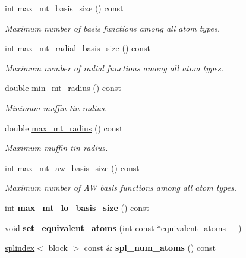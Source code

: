 \begin{DoxyCompactItemize}
int \hyperlink{classsirius_1_1_unit__cell_a22a732322dd61dda3120337e058047e0}{max\+\_\+mt\+\_\+basis\+\_\+size} () const 
\begin{DoxyCompactList}\small\item\em Maximum number of basis functions among all atom types. \end{DoxyCompactList}\item 
int \hyperlink{classsirius_1_1_unit__cell_a8f80f526f0dd59e15daef8439af0b577}{max\+\_\+mt\+\_\+radial\+\_\+basis\+\_\+size} () const 
\begin{DoxyCompactList}\small\item\em Maximum number of radial functions among all atom types. \end{DoxyCompactList}\item 
double \hyperlink{classsirius_1_1_unit__cell_a60ff58a73dd2989afdafc9b37fbd68df}{min\+\_\+mt\+\_\+radius} () const 
\begin{DoxyCompactList}\small\item\em Minimum muffin-\/tin radius. \end{DoxyCompactList}\item 
double \hyperlink{classsirius_1_1_unit__cell_ae4e421483e55a809f781fb9f197078c6}{max\+\_\+mt\+\_\+radius} () const 
\begin{DoxyCompactList}\small\item\em Maximum muffin-\/tin radius. \end{DoxyCompactList}\item 
int \hyperlink{classsirius_1_1_unit__cell_ae45e48832c8b50a4f514de66c4245cd3}{max\+\_\+mt\+\_\+aw\+\_\+basis\+\_\+size} () const 
\begin{DoxyCompactList}\small\item\em Maximum number of A\+W basis functions among all atom types. \end{DoxyCompactList}\item 
\hypertarget{classsirius_1_1_unit__cell_a6da1be0a9b9b366aa731d847448e3fd5}{}int {\bfseries max\+\_\+mt\+\_\+lo\+\_\+basis\+\_\+size} () const \label{classsirius_1_1_unit__cell_a6da1be0a9b9b366aa731d847448e3fd5}

\item 
\hypertarget{classsirius_1_1_unit__cell_abd52c0691717c6b4d3b68e20cdf3cbea}{}void {\bfseries set\+\_\+equivalent\+\_\+atoms} (int const $\ast$equivalent\+\_\+atoms\+\_\+\+\_\+)\label{classsirius_1_1_unit__cell_abd52c0691717c6b4d3b68e20cdf3cbea}

\item 
\hypertarget{classsirius_1_1_unit__cell_aad6b5529e2162032bc9afc4246ef015a}{}\hyperlink{classsddk_1_1splindex}{splindex}$<$ block $>$ const \& {\bfseries spl\+\_\+num\+\_\+atoms} () const \label{classsirius_1_1_unit__cell_aad6b5529e2162032bc9afc4246ef015a}


\end{DoxyCompactItemize}
